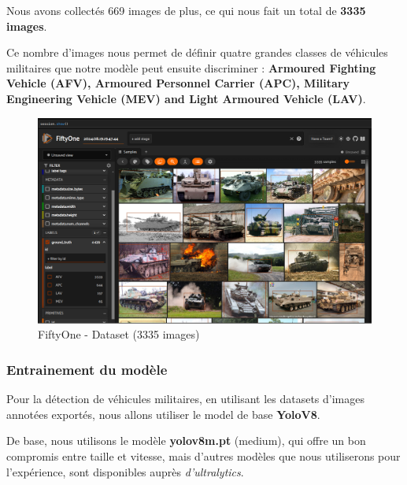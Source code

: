 \noindent Nous avons collectés 669 images de plus, ce qui nous fait un total de \textbf{3335 images}.

Ce nombre d'images nous permet de définir quatre grandes classes de véhicules militaires que notre modèle peut ensuite discriminer : \textbf{Armoured Fighting Vehicle (AFV), Armoured Personnel Carrier (APC), Military Engineering Vehicle (MEV) and Light Armoured Vehicle (LAV)}.


\begin{figure}[H]
	\center
	\includegraphics[width=\textwidth]{./images/fiftyone-dataset.png}
	\caption[Fiftyone dataset]{FiftyOne - Dataset (3335 images)}\label{fig:fiftyone-dataset}
\end{figure}

\subsubsection{Entrainement du modèle}

Pour la détection de véhicules militaires, en utilisant les datasets d'images annotées exportés, nous allons utiliser le model de base \textbf{YoloV8}.

De base, nous utilisons le modèle \textbf{yolov8m.pt} (medium), qui offre un bon compromis entre taille et vitesse, mais d'autres modèles que nous utiliserons pour l'expérience, sont disponibles auprès \textit{d'ultralytics}.

